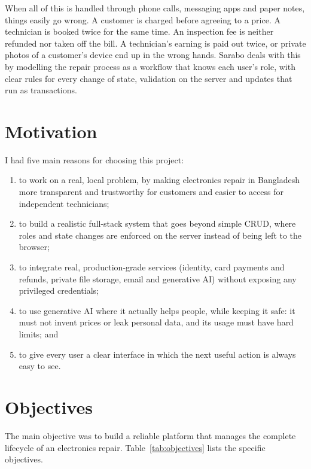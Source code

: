 \documentclass{standalone}
\begin{document}
When all of this is handled through phone calls, messaging apps and paper notes, things easily go wrong. A customer is charged before agreeing to a price. A technician is booked twice for the same time. An inspection fee is neither refunded nor taken off the bill. A technician's earning is paid out twice, or private photos of a customer's device end up in the wrong hands. Sarabo deals with this by modelling the repair process as a workflow that knows each user's role, with clear rules for every change of state, validation on the server and updates that run as transactions.

\section{Motivation}
I had five main reasons for choosing this project:
\begin{enumerate}
  \item to work on a real, local problem, by making electronics repair in Bangladesh more transparent and trustworthy for customers and easier to access for independent technicians;
  \item to build a realistic full-stack system that goes beyond simple CRUD, where roles and state changes are enforced on the server instead of being left to the browser;
  \item to integrate real, production-grade services (identity, card payments and refunds, private file storage, email and generative AI) without exposing any privileged credentials;
  \item to use generative AI where it actually helps people, while keeping it safe: it must not invent prices or leak personal data, and its usage must have hard limits; and
  \item to give every user a clear interface in which the next useful action is always easy to see.
\end{enumerate}

\section{Objectives}
The main objective was to build a reliable platform that manages the complete lifecycle of an electronics repair. Table~\ref{tab:objectives} lists the specific objectives.
\end{document}
